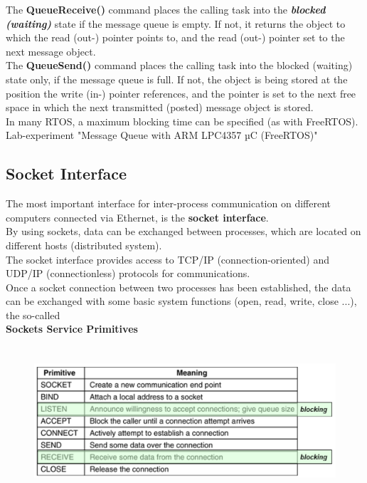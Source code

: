 The \textbf{QueueReceive()} command places the calling task into the \textbf{\textit{blocked (waiting)}} state if the message queue is empty. If not, it returns the object to which the read (out-) pointer points to, and the read (out-) pointer set to the next message object.\\

The \textbf{QueueSend()} command places the calling task into the blocked (waiting) state only, if the message queue is full. If not, the object is being stored at the position the write (in-) pointer references, and the pointer is set to the next free space in which the next transmitted (posted) message object is stored.\\

In many RTOS, a maximum blocking time can be specified (as with FreeRTOS).\\

Lab-experiment "Message Queue with ARM LPC4357 µC (FreeRTOS)"

\subsection{Socket Interface}

The most important interface for inter-process communication on different computers connected via Ethernet, is the \textbf{socket interface}.\\

By using sockets, data can be exchanged between processes, which are located on different hosts (distributed system). \\

The socket interface provides access to TCP/IP (connection-oriented) and UDP/IP (connectionless) protocols for communications. \\

Once a socket connection between two processes has been established, the data can be exchanged with some basic system functions (open, read, write, close ...), the so-called \\

\textbf{Sockets Service Primitives}

 	\begin{figure}[h]
    \centering
    \includegraphics[width=12cm, height=5.5cm]{Images/image19.png}
    \label{fig:Fig }
    \end{figure}
    
